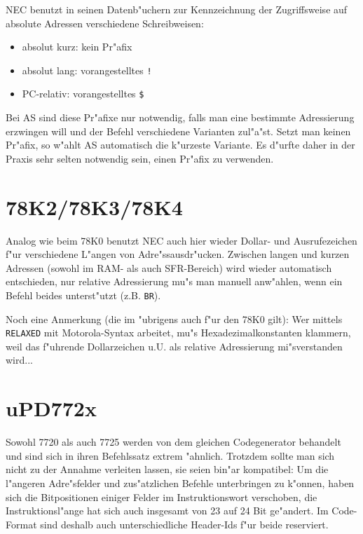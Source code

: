 \documentclass[12pt,a4paper,twoside]{report}
\begin{document}
NEC benutzt in seinen Datenb"uchern zur Kennzeichnung der Zugriffsweise
auf absolute Adressen verschiedene Schreibweisen:
\begin{itemize}
\item{absolut kurz: kein Pr"afix}
\item{absolut lang: vorangestelltes \verb"!"}
\item{PC-relativ: vorangestelltes \verb"$"}
\end{itemize}
Bei AS sind diese Pr"afixe nur notwendig, falls man eine bestimmte
Adressierung erzwingen will und der Befehl verschiedene Varianten
zul"a"st.  Setzt man keinen Pr"afix, so w"ahlt AS automatisch die
k"urzeste Variante.  Es d"urfte daher in der Praxis sehr selten
notwendig sein, einen Pr"afix zu verwenden.


\section{78K2/78K3/78K4}
\label{78K234Spec}

Analog wie beim 78K0 benutzt NEC auch hier wieder Dollar- und
Ausrufezeichen f"ur verschiedene L"angen von Adre"ssausdr"ucken.
Zwischen langen und kurzen Adressen (sowohl im RAM- als auch
SFR-Bereich) wird wieder automatisch entschieden, nur relative
Adressierung mu"s man manuell anw"ahlen, wenn ein Befehl beides
unterst"utzt (z.B. {\tt BR}).

Noch eine Anmerkung (die im "ubrigens auch f"ur den 78K0 gilt): Wer
mittels {\tt RELAXED} mit Motorola-Syntax arbeitet, mu"s
Hexadezimalkonstanten klammern, weil das f"uhrende Dollarzeichen u.U. als
relative Adressierung mi"sverstanden wird...


\section{uPD772x}

Sowohl 7720 als auch 7725 werden von dem gleichen Codegenerator behandelt
und sind sich in ihren Befehlssatz extrem "ahnlich.  Trotzdem sollte man
sich nicht zu der Annahme verleiten lassen, sie seien bin"ar kompatibel:
Um die l"angeren Adre"sfelder und zus"atzlichen Befehle unterbringen zu
k"onnen, haben sich die Bitpositionen einiger Felder im Instruktionswort
verschoben, die Instruktionsl"ange hat sich auch insgesamt von 23 auf 24
Bit ge"andert.  Im Code-Format sind deshalb auch unterschiedliche
Header-Ids f"ur beide reserviert.
\end{document}
